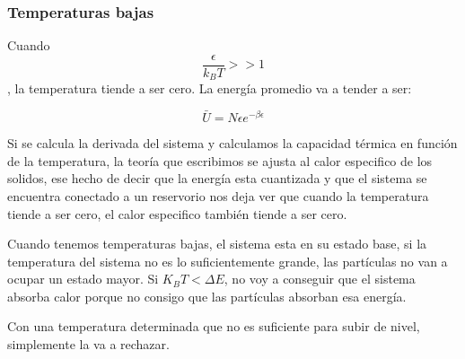 \documentclass[11pt,fleqn]{book}
\begin{document}
\subsubsection{Temperaturas bajas}

Cuando $$\frac{\epsilon}{k_{B}T}>>1$$, la temperatura tiende a ser cero. La energía promedio va a tender a ser: 

\begin{equation}
    \bar{U}=N\epsilon e^{-\beta\epsilon}
    \label{Eq. 4.33}
\end{equation}


Si se calcula la derivada del sistema y calculamos la capacidad térmica en función de la temperatura, la teoría que escribimos se ajusta al calor especifico de los solidos, ese hecho de decir que la energía esta cuantizada y que el sistema se encuentra conectado a un reservorio nos deja ver que cuando la temperatura tiende a ser cero, el calor especifico también tiende a ser cero.

Cuando tenemos temperaturas bajas, el sistema esta en su estado base, si la temperatura del sistema no es lo suficientemente grande, las partículas no van a ocupar un estado mayor. Si $K_{B}T<\Delta E$, no voy a conseguir que el sistema absorba calor porque no consigo que las partículas absorban esa energía.


Con una temperatura determinada que no es suficiente para subir de nivel, simplemente la va a rechazar. 
\end{document}
